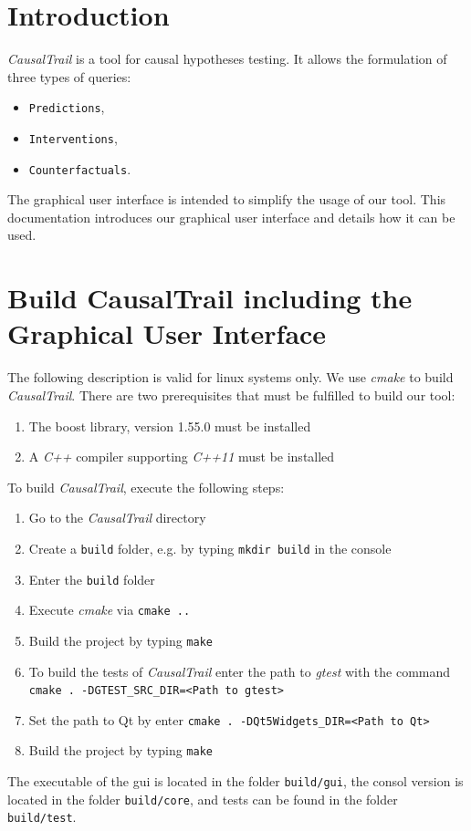 \section{Introduction}
\textit{CausalTrail} is a tool for causal hypotheses testing.
It allows the formulation of three types of queries:
\begin{itemize}
 \item \texttt{Predictions},
 \item \texttt{Interventions},
 \item \texttt{Counterfactuals}.
\end{itemize}
\noindent
The graphical user interface is intended to simplify the usage of our tool.
This documentation introduces our graphical user interface and details how
it can be used.

\section{Build CausalTrail including the Graphical User Interface}
The following description is valid for linux systems only.
We use \textit{cmake} to build \textit{CausalTrail}.
There are two prerequisites that must be fulfilled to build our tool:
\begin{enumerate}
\item {The boost library, version 1.55.0 must be installed}
\item {A \textit{C++} compiler supporting \textit{C++11} must be installed}
\end{enumerate}
To build \textit{CausalTrail}, execute the following steps:
\begin{enumerate}
\item Go to the \textit{CausalTrail} directory
\item Create a \texttt{build} folder, e.g. by typing \texttt{mkdir build} in the console
\item Enter the \texttt{build} folder
\item Execute \textit{cmake} via \texttt{cmake ..}
\item Build the project by typing \texttt{make}
\item To build the tests of \textit{CausalTrail} enter the path to \textit{gtest} with the command \texttt{cmake . -DGTEST\_SRC\_DIR=<Path to gtest>}
\item Set the path to Qt by enter \texttt{cmake . -DQt5Widgets\_DIR=<Path to Qt>}
\item Build the project by typing \texttt{make}
\end{enumerate}
The executable of the gui is located in the folder \texttt{build/gui}, the consol version is located in the folder 
\texttt{build/core}, and tests can be found in the folder \texttt{build/test}.

